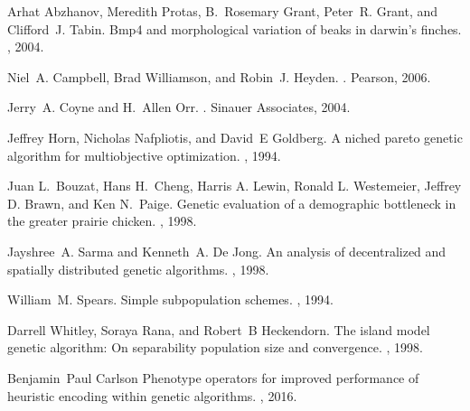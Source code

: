 \documentclass[conference]{IEEEtran}
\begin{document}

\begin{thebibliography}{1}

Arhat Abzhanov, Meredith Protas, B.~Rosemary Grant, Peter~R. Grant, and Clifford~J. Tabin.
\newblock Bmp4 and morphological variation of beaks in darwin's finches.
, 2004.

Niel~A. Campbell, Brad Williamson, and Robin~J. Heyden.
.
\newblock Pearson, 2006.

Jerry~A. Coyne and H.~Allen Orr.
.
\newblock Sinauer Associates, 2004.

Jeffrey Horn, Nicholas Nafpliotis, and David~E Goldberg.
\newblock A niched pareto genetic algorithm for multiobjective optimization.
, 1994.

Juan L.~Bouzat, Hans H.~Cheng, Harris A. Lewin, Ronald L. Westemeier, Jeffrey D. Brawn, and Ken N.~Paige.
\newblock Genetic evaluation of a demographic bottleneck in the greater prairie chicken.
, 1998.

Jayshree~A. Sarma and Kenneth~A. De Jong.
\newblock An analysis of decentralized and spatially distributed genetic algorithms.
, 1998.

William~M. Spears.
\newblock Simple subpopulation schemes.
, 1994.

Darrell Whitley, Soraya Rana, and Robert~B Heckendorn.
\newblock The island model genetic algorithm: On separability population size and convergence.
, 1998.

Benjamin~Paul Carlson
\newblock Phenotype operators for improved performance of heuristic encoding within genetic algorithms.
, 2016.

\end{thebibliography}
\end{document}
